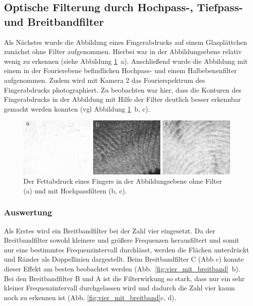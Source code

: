 \subsection{Optische Filterung durch Hochpass-, Tiefpass- und Breitbandfilter}

Als Nächstes wurde die Abbildung eines Fingerabdrucks auf einem Glasplättchen zunächst ohne Filter aufgenommen. Hierbei war in der Abbildungsebene relativ wenig zu erkennen (siehe Abbildung \ref{fig:example20_Hochpass}~a). Anschließend wurde die Abbildung mit einem in der Fourierebene befindlichen Hochpass- und einem Halbebenenfilter aufgenommen. Zudem wird mit Kamera 2 das Fourierspektrum des Fingerabdrucks photographiert. Zu beobachten war hier, dass die Konturen des Fingerabdrucks in der Abbildung mit Hilfe der Filter deutlich besser erkennbar gemacht werden konnten (vgl Abbildung \ref{fig:example20_Hochpass}~b, c).\\


\begin{figure}[h]
	\centering
	\includegraphics{images/ergebniss_Fingerab/abb.pdf}
	\caption{
		Der Fettabdruck eines Fingers in der Abbildungsebene ohne Filter (a) und mit Hochpassfiltern (b, c).
	}
	\label{fig:example20_Hochpass}
\end{figure}

\subsubsection*{Auswertung}

Als Erstes wird ein Breitbandfilter bei der Zahl vier eingesetzt. Da der Breitbandfilter sowohl kleinere und größere Frequenzen herausfiltert und somit nur eine bestimmtes Frequenzintervall durchlässt, werden die Flächen unterdrückt und Ränder als Doppellinien dargestellt. Beim Breitbandfilter C (Abb %
c) konnte dieser Effekt am besten beobachtet werden (Abb.~\ref{fig:vier_mit_breitband}~b). Bei den Breitbandfilter B und A ist die Filterwirkung so stark, dass nur
ein sehr kleiner Frequenzintervall durchgelassen wird und dadurch die Zahl vier kaum noch zu erkennen ist (Abb. \ref{fig:vier_mit_breitband}c, d).


